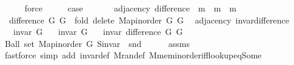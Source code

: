 \begin{isabellebody}
\ \ \ \ \isamarkupfalse%
\ force\isanewline
\ \ \isamarkupfalse%
\ \isamarkupfalse%
\ {\isacharquery}{\kern0pt}case\isanewline
\ \ \ \ \isacommand{{\isachardot}{\kern0pt}}\isamarkupfalse%
\isanewline
{}\isamarkupfalse%
%
\endisatagproof
{\isafoldproof}%
%
\isadelimproof
\isanewline
%
\endisadelimproof
\isanewline
\isanewline
{}\isamarkupfalse%
\ {\isacharparenleft}{\kern0pt}\ adjacency{\isacharparenright}{\kern0pt}\ difference\ {\isacharcolon}{\kern0pt}{\isacharcolon}{\kern0pt}\ {\isachardoublequoteopen}{\isacharprime}{\kern0pt}m\ {\isasymRightarrow}\ {\isacharprime}{\kern0pt}m\ {\isasymRightarrow}\ {\isacharprime}{\kern0pt}m{\isachardoublequoteclose}\ \isanewline
\ \ {\isachardoublequoteopen}difference\ G{}\ G{}\ {\isasymequiv}\ fold\ delete{\isacharunderscore}{\kern0pt}{}\ {\isacharparenleft}{\kern0pt}Map{\isacharunderscore}{\kern0pt}inorder\ G{}{\isacharparenright}{\kern0pt}\ G{}{\isachardoublequoteclose}\isanewline
\isanewline
{}\isamarkupfalse%
\ {\isacharparenleft}{\kern0pt}\ adjacency{\isacharparenright}{\kern0pt}\ invar{\isacharunderscore}{\kern0pt}difference{\isacharcolon}{\kern0pt}\isanewline
\ \ \ {\isachardoublequoteopen}invar\ G{}{\isachardoublequoteclose}\isanewline
\ \ \ {\isachardoublequoteopen}invar\ G{}{\isachardoublequoteclose}\isanewline
\ \ \ {\isachardoublequoteopen}invar\ {\isacharparenleft}{\kern0pt}difference\ G{}\ G{}{\isacharparenright}{\kern0pt}{\isachardoublequoteclose}\isanewline
%
\isadelimproof
%
\endisadelimproof
%
\isatagproof
{}\isamarkupfalse%
\ {\isacharminus}{\kern0pt}\isanewline
\ \ \isamarkupfalse%
\ {\isachardoublequoteopen}Ball\ {\isacharparenleft}{\kern0pt}set\ {\isacharparenleft}{\kern0pt}Map{\isacharunderscore}{\kern0pt}inorder\ G{}{\isacharparenright}{\kern0pt}{\isacharparenright}{\kern0pt}\ {\isacharparenleft}{\kern0pt}S{\isachardot}{\kern0pt}invar\ {\isasymcirc}\ snd{\isacharparenright}{\kern0pt}{\isachardoublequoteclose}\isanewline
\ \ \ \ \isamarkupfalse%
\ assms{\isacharparenleft}{\kern0pt}{}{\isacharparenright}{\kern0pt}\isanewline
\ \ \ \ \isamarkupfalse%
\ {\isacharparenleft}{\kern0pt}fastforce\ simp\ add{\isacharcolon}{\kern0pt}\ invar{\isacharunderscore}{\kern0pt}def\ M{\isachardot}{\kern0pt}ran{\isacharunderscore}{\kern0pt}def\ M{\isachardot}{\kern0pt}mem{\isacharunderscore}{\kern0pt}inorder{\isacharunderscore}{\kern0pt}iff{\isacharunderscore}{\kern0pt}lookup{\isacharunderscore}{\kern0pt}eq{\isacharunderscore}{\kern0pt}Some{\isacharparenright}{\kern0pt}\isanewline

\end{isabellebody}

